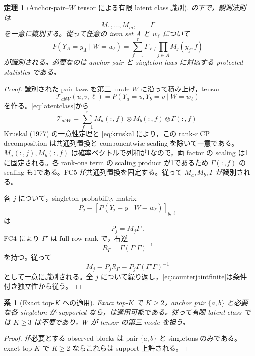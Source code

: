 \documentclass[11pt,a4paper]{ltjsarticle}
\newtheorem{theorem}{定理}[section]
\newtheorem{corollary}{系}[section]
\theoremstyle{remark}
\newcommand{\cT}{\mathcal T}
\begin{document}
\begin{theorem}[Anchor-pair--$W$ tensor による有限 latent class 識別]\label{thm:finiteclass}
の下で，観測法則は
\[
M_1,\ldots,M_m,\qquad \Gamma
\]
を一意に識別する。従って任意の item set $A$ と $w_\ell$ について
\begin{equation}
P(Y_A=y_A\mid W=w_\ell)
=\sum_{f=1}^r\Gamma_{\ell f}\prod_{j\in A}M_j(y_j,f)
\label{eq:counterjointfinite}
\end{equation}
が識別される。必要なのは anchor pair と singleton laws に対応する protected statistics である。
\end{theorem}

\begin{proof}
識別された pair laws を第三 mode $W$ に沿って積み上げ，tensor
\[
\cT_{abW}(u,v,\ell)
=P(Y_a=u,Y_b=v\mid W=w_\ell)
\]
を作る。\eqref{eq:latentclass}から
\begin{equation}
\cT_{abW}
=\sum_{f=1}^rM_a(:,f)\otimes M_b(:,f)\otimes\Gamma(:,f).
\label{eq:cpfinite}
\end{equation}
Kruskal (1977) の一意性定理と \eqref{eq:kruskal}により，この rank-$r$ CP decomposition は共通列置換と componentwise scaling を除いて一意である。$M_a(:,f),M_b(:,f)$ は確率ベクトルで列和が1なので，両 factor の scaling は1に固定される。各 rank-one term の scaling product が1であるため $\Gamma(:,f)$ の scaling も1である。FC5 が共通列置換を固定する。従って $M_a,M_b,\Gamma$ が識別される。

各 $j$ について，singleton probability matrix
\[
P_j=[P(Y_j=y\mid W=w_\ell)]_{y,\ell}
\]
は
\begin{equation}
P_j=M_j\Gamma'.
\label{eq:singletonmatrix}
\end{equation}
FC4 により $\Gamma'$ は full row rank で，右逆
\[
R_\Gamma=\Gamma(\Gamma'\Gamma)^{-1}
\]
を持つ。従って
\[
M_j=P_jR_\Gamma
=P_j\Gamma(\Gamma'\Gamma)^{-1}
\]
として一意に識別される。全 $j$ について繰り返し，\eqref{eq:counterjointfinite}は条件付き独立性から従う。
\end{proof}

\begin{corollary}[Exact top-$K$ への適用]\label{cor:finiteTopK}
Exact top-$K$ で $K\ge2$，anchor pair $\{a,b\}$ と必要な各 singleton が supported なら，は適用可能である。従って有限 latent class では $K\ge3$ は不要であり，$W$ が tensor の第三 mode を担う。
\end{corollary}

\begin{proof}
が必要とする observed blocks は pair $\{a,b\}$ と singletons のみである。exact top-$K$ で $K\ge2$ ならこれらは support 上許される。
\end{proof}
\end{document}
